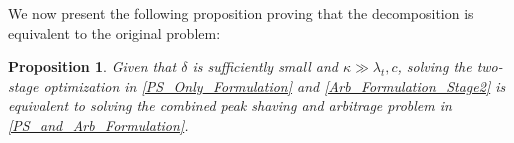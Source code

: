 \documentclass[conference]{IEEEtran}
\newtheorem{proposition}[theorem]{\textbf{Proposition}}
\begin{document}





We now present the following proposition proving that the decomposition is equivalent to the original problem:

\begin{proposition}\label{Equivalence_Prop}
    Given that $\delta$ is sufficiently small and $\kappa \gg \lambda_t, c$, solving the two-stage optimization in \eqref{PS_Only_Formulation} and \eqref{Arb_Formulation_Stage2} is equivalent to solving the combined peak shaving and arbitrage problem in \eqref{PS_and_Arb_Formulation}.
\end{proposition}
\end{document}
